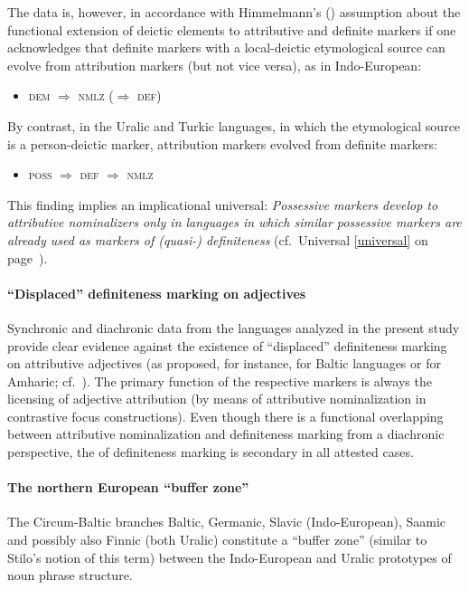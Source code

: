 The data is, however, in accordance with Himmelmann's (\citeyear[220–221]{himmelmann1997}) assumption about the functional extension of deictic elements to attributive and definite markers if one acknowledges that definite markers with a local-deictic etymological source can evolve from attribution markers (but not vice versa), as in Indo-European:
\begin{itemize}
\item \textsc{dem $\Rightarrow$ nmlz ($\Rightarrow$ def)}
\end{itemize}
By contrast, in the Uralic and Turkic languages, in which the etymological source is a person-deictic marker, attribution markers evolved from definite markers:
\begin{itemize}
\item \textsc{poss $\Rightarrow$ def $\Rightarrow$ nmlz}
\end{itemize}
This finding implies an implicational universal: \textit{Possessive markers develop to attributive nominalizers only in languages in which similar possessive markers are already used as markers of (quasi-) definiteness} (cf.~Universal \ref{universal} on page~\pageref{universal}).

\paragraph*{“Displaced” definiteness marking on adjectives}
Synchronic and diachronic data from the languages analyzed in the present study provide clear evidence against the existence of “displaced” definiteness marking on attributive adjectives (as proposed, for instance, for Baltic languages or for Amharic; cf.~\citealt[122]{dahl2015a}). The primary function of the respective markers is always the licensing of adjective attribution (by means of attributive nominalization in contrastive focus constructions). Even though there is a functional overlapping between attributive nominalization and definiteness marking from a diachronic perspective, the  of definiteness marking is secondary in all attested cases.

\paragraph*{The northern European “buffer zone”}
The Circum-Baltic branches Baltic, Germanic, Slavic (Indo-European), Saamic and possibly also Finnic (both Uralic) constitute a “buffer zone” (similar to Stilo's \citeyear{stilo2005} notion of this term) between the Indo-European and Uralic prototypes of noun phrase structure.

